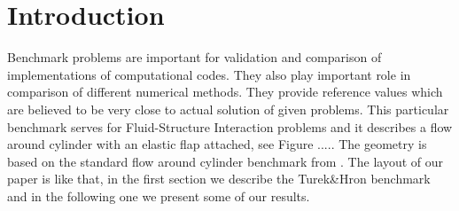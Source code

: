 \section*{Introduction}
Benchmark problems are important for validation and comparison of implementations of 
computational codes. They also play important role in comparison of different numerical methods. They provide reference
values which are believed to be very close to actual solution of given problems. 
This particular benchmark serves for Fluid-Structure Interaction problems and it describes
a flow around cylinder with an elastic flap attached, see Figure .....
The geometry is based on the standard flow around cylinder benchmark from
\cite{TurekSchaefer1996}. The layout of our paper is like that, in the first section we describe 
the Turek\&Hron benchmark and in the following one we present some of our results.
